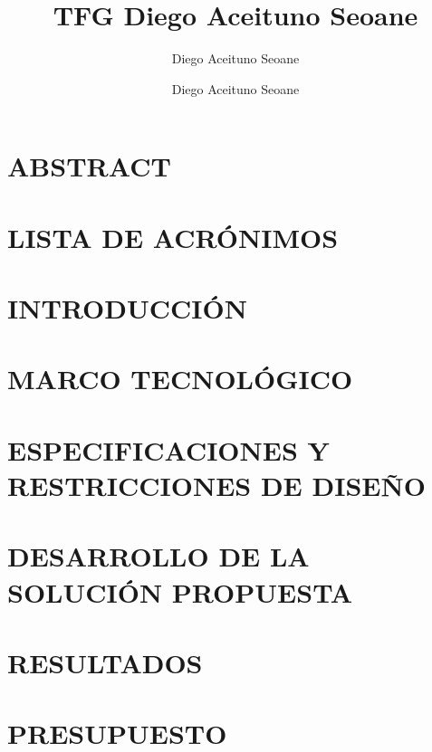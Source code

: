 \documentclass[a4paper,10pt,twoside]{article}
\title{TFG Diego Aceituno Seoane}
\author{Diego Aceituno Seoane}
\date{Diego Aceituno Seoane}
\begin{document}
\begin{titlepage}
    
\end{titlepage}

\newpage
{}


\clearpage

\section*{ABSTRACT}


\clearpage
\tableofcontents

\clearpage

\section*{LISTA DE ACRÓNIMOS}


\clearpage
\section{INTRODUCCIÓN}


\clearpage
\section{MARCO TECNOLÓGICO}


\clearpage
\section{ESPECIFICACIONES Y RESTRICCIONES DE DISEÑO}


\clearpage
\section{DESARROLLO DE LA SOLUCIÓN PROPUESTA}


\clearpage
\section{RESULTADOS}


\clearpage
\section{PRESUPUESTO}

\end{document}
